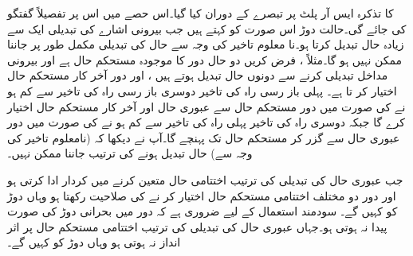  کا تذکرہ ایس آر پلٹ پر تبصرے کے دوران کیا گیا۔اس حصے میں اس پر تفصیلاً گفتگو کی جائے گی۔حالت دوڑ اس صورت کو کہتے ہیں جب بیرونی اشارے کی تبدیلی ایک سے زیادہ حال تبدیل کرتا ہو۔نا معلوم تاخیر کی وجہ سے حال کی تبدیلی مکمل طور پر جاننا ممکن نہیں ہو گا۔مثلاً ، فرض کریں دو حال دور کا موجودہ مستحکم حال  ہے اور بیرونی مداخل تبدیلی کرنے سے دونوں حال تبدیل ہوتے ہیں ، اور دور آخر کار  مستحکم حال اختیار کر تا ہے۔ پہلی باز رسی راہ کی تاخیر دوسری باز رسی راہ کی تاخیر سے کم ہو نے کی صورت میں دور مستحکم حال  سے عبوری حال  اور آخر کار مستحکم حال  اختیار کرے گا جبکہ دوسری راہ کی تاخیر پہلی راہ کی تاخیر سے کم ہو نے کی صورت میں دور عبوری حال  سے گزر کر مستحکم حال  تک پہنچے گا۔آپ نے دیکھا کہ (نامعلوم تاخیر کی وجہ سے) حال تبدیل ہونے کی ترتیب جاننا ممکن نہیں۔

جب عبوری حال کی تبدیلی کی ترتیب اختتامی حال متعین کرنے میں کردار ادا کرتی ہو اور دور دو مختلف اختتامی مستحکم حال اختیار کر نے کی صلاحیت رکھتا ہو وہاں دوڑ کو  کہیں گے۔ سودمند استعمال کے لیے ضروری ہے کہ دور میں بحرانی دوڑ کی صورت پیدا نہ ہوتی ہو۔جہاں عبوری حال کی تبدیلی کی ترتیب اختتامی مستحکم حال پر اثر انداز نہ ہوتی ہو وہاں دوڑ کو کہیں گے۔


